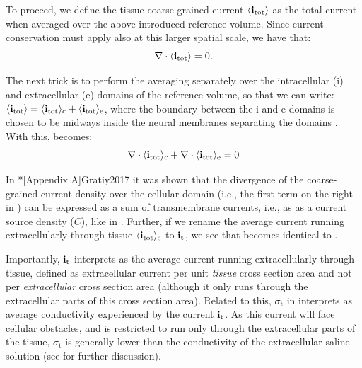 To proceed, we define the tissue-coarse grained current $\left<{\bf i}_\text{tot}\right>$ 
as the total current when averaged over the above introduced reference volume. 
Since current conservation must apply also at this larger spatial scale, we have that:
\begin{equation}
{\bf \nabla} \cdot \langle{\bf i}_\text{tot}\rangle = 0.
\label{eq:Basics:Sergey2}
\end{equation}

The next trick is to perform the averaging separately over 
the intracellular (i) and extracellular (e) domains of the reference volume, so that we can write: 
$\langle{\bf i}_\text{tot}\rangle = \langle{\bf i}_\text{tot}\rangle_\text{c} + \langle{\bf i}_\text{tot}\rangle_\text{e}$, 
where the boundary between the i and e domains is chosen to be midways 
inside the neural membranes separating the domains 
. With this,  becomes: 
\begin{equation}
{\bf \nabla} \cdot \langle{\bf i}_\text{tot}\rangle_\text{c}  + {\bf \nabla}\cdot \langle{\bf i}_\text{tot}\rangle_\text{e} = 0
\label{eq:Basics:Sergey3}
\end{equation}

In \citeasnoun**[Appendix A]{Gratiy2017} it was shown that the divergence of the coarse-grained current density 
over the cellular domain (i.e., the first term on the right in ) 
can be expressed as a sum of transmembrane currents, 
i.e., as as a current source density ($C$), like in . 
Further, if we rename the average current running extracellularly through tissue 
$\langle{\bf i}_\text{tot}\rangle_\text{e}$ to ${\bf i}_\text{t}$, 
we see that  becomes identical to  . 

Importantly, ${\bf i}_\text{t}$ interprets as the average current running extracellularly through tissue, 
defined as extracellular current per unit \textit{tissue} cross section area 
and not per \textit{extracellular} cross section area 
(although it only runs through the extracellular parts of this cross section area). 
Related to this, $\sigma_\text{t}$ in  interprets as average conductivity 
experienced by the current ${\bf i}_\text{t}$. 
As this current will face cellular obstacles, 
and is restricted to run only through the extracellular parts of the tissue, 
$\sigma_\text{t}$ is generally lower than the conductivity of the extracellular saline solution 
(see  for further discussion). 


